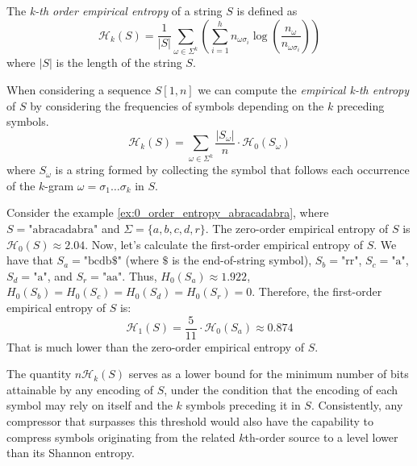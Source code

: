 \begin{definition} \label{def:kth_order_empirical_entropy}
    The \emph{k-th order empirical entropy} of a string $S$ is defined as
    \begin{equation}
        \mathcal{H}_k(S) = \frac{1}{|S|} \sum_{\omega \in \Sigma^k} \left ( \sum_{i=1}^h n_{\omega\sigma_i} \log \left ( \frac{n_\omega}{n_{\omega\sigma_i}} \right) \right )
    \end{equation}
    where $|S|$ is the length of the string $S$.
\end{definition}

\noindent When considering a sequence $S[1,n]$ we can compute the \emph{empirical k-th entropy} of $S$ by considering the frequencies of symbols depending on the $k$ preceding symbols.
\begin{equation}
    \mathcal{H}_k(S) = \sum_{\omega \in \Sigma^k} \frac{|S_\omega|}{n} \cdot \mathcal{H_0}(S_\omega)
\end{equation}
where $S_\omega$ is a string formed by collecting the symbol that follows each occurrence of the $k$-gram $\omega = \sigma_1 \dots \sigma_k$ in $S$.

\begin{example}
    Consider the example \ref{ex:0_order_entropy_abracadabra}, where $S = \text{"abracadabra"}$ and $\Sigma = \{a, b, c, d, r\}$. The zero-order empirical entropy of $S$ is $\mathcal{H}_0(S) \approx 2.04$. Now, let's calculate the first-order empirical entropy of $S$. We have that $S_a = \text{"bcdb\$"}$ (where $\$$ is the end-of-string symbol), $S_b = \text{"rr"}$, $S_c = \text{"a"}$, $S_d = \text{"a"}$, and $S_r = \text{"aa"}$. Thus, $H_0(S_a) \approx 1.922$, $H_0(S_b) = H_0(S_c) = H_0(S_d) = H_0(S_r) = 0$. Therefore, the first-order empirical entropy of $S$ is:
    \[
        \mathcal{H}_1(S) = \frac{5}{11} \cdot \mathcal{H}_0(S_a) \approx 0.874
    \]
    That is much lower than the zero-order empirical entropy of $S$.
\end{example}

\noindent The quantity $n \mathcal{H}_k(S)$ serves as a lower bound for the minimum number of bits attainable by any encoding of $S$, under the condition that the encoding of each symbol may rely on itself and the $k$ symbols preceding it in $S$. Consistently, any compressor that surpasses this threshold would also have the capability to compress symbols originating from the related $k$th-order source to a level lower than its Shannon entropy.

